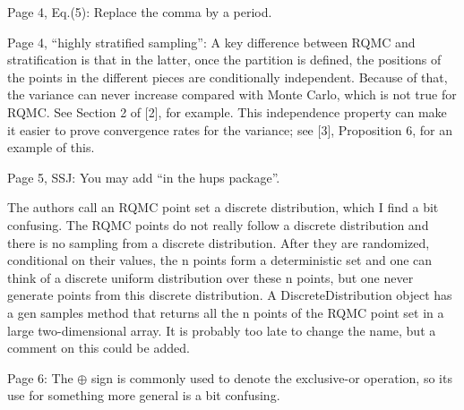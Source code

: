 \documentclass{amsart}
\begin{document}
\vspace{1cm}

Page 4, Eq.(5): Replace the comma by a period.

\vspace{1cm}

Page 4, ``highly stratified sampling'': A key difference between RQMC and stratification is that in the latter, once the partition is defined, the positions of the points in the different pieces are conditionally independent. Because of that, the variance can never increase compared with Monte Carlo, which is not true for RQMC. See Section 2 of [2], for example. This independence property can make it easier to prove convergence rates for the variance; see
[3], Proposition 6, for an example of this. 


\vspace{1cm}

Page 5, SSJ: You may add “in the hups package”.

\vspace{1cm}

The authors call an RQMC point set a discrete distribution, which I find a bit confusing. The
RQMC points do not really follow a discrete distribution and there is no sampling from a discrete distribution. After they are randomized, conditional on their values, the n points form a deterministic set and one can think of a discrete uniform distribution over these n points, but one never generate points from this discrete distribution. A DiscreteDistribution object has a gen samples method that returns all the n points of the RQMC point set in a
large two-dimensional array. It is probably too late to change the name, but a comment on this could be added.


\vspace{1cm}

Page 6: The $\oplus$ sign is commonly used to denote the exclusive-or operation, so its use for
something more general is a bit confusing.
\end{document}
